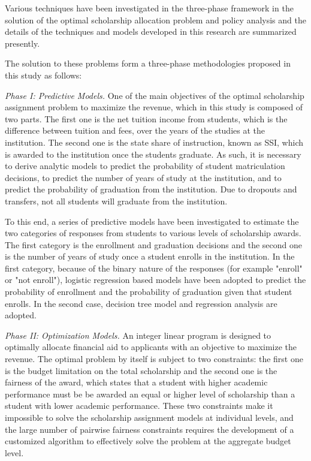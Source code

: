 \documentclass[12pt,english]{report}
\begin{document}
Various techniques have been investigated in the three-phase framework in the solution of the optimal scholarship allocation problem and policy analysis and the details of the techniques and models developed in this research are summarized presently.

The solution to these problems form a three-phase methodologies proposed in this study as follows:

\vspace*{.1in} 
\noindent \textit{Phase I: Predictive Models.} 
One of the main objectives of the optimal scholarship assignment problem to maximize the revenue, which in this study is composed of two parts. The first one is the net tuition income from students, which is the difference between tuition and fees, over the years of the studies at the institution. The second one is the state share of instruction, known as SSI, which is awarded to the institution once the students graduate.  As such,  it is necessary to derive analytic models to predict the probability of student matriculation decisions, to predict the number of years of study at the institution, and to predict the probability of graduation from the institution. Due to dropouts and transfers, not all students will graduate from the institution. 

To this end, a series of predictive models have been investigated to estimate the two categories of responses from students to various levels of scholarship awards. The first category is the enrollment and graduation decisions and the second one is the number of years of study once a student enrolls in the institution. In the first category, because of the binary nature of the responses (for example "enroll" or "not enroll"), logistic regression based models have been adopted to predict the probability of enrollment and the probability of graduation given that student enrolls. In the second case, decision tree model and regression analysis are adopted.


\noindent \textit{Phase II: Optimization Models.}  An integer linear program is designed to optimally allocate financial aid to applicants with an objective to maximize the revenue. The optimal problem by itself is subject to two constraints: the first one is the budget limitation on the total scholarship and the second one is the fairness of the award, which states that a student with higher academic performance must be be awarded an equal or higher level of scholarship than a student with lower academic performance. These two constraints make it impossible to solve the scholarship assignment models at individual levels, and the large number of pairwise fairness constraints requires the development of a customized algorithm to effectively solve the problem at the aggregate budget level.
\end{document}
